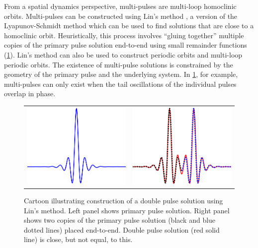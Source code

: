 \documentclass[12pt,reqno,oneside,hidelinks]{article}
\begin{document}
From a spatial dynamics perspective, multi-pulses are multi-loop homoclinic orbits. Multi-pulses can be constructed using Lin's method \cite{Lin2008}, a version of the Lyapunov-Schmidt method which can be used to find solutions that are close to a homoclinic orbit. Heuristically, this process involves ``gluing together'' multiple copies of the primary pulse solution end-to-end using small remainder functions (\cref{fig:linsmethod}). Lin's method can also be used to construct periodic orbits and multi-loop periodic orbits. The existence of multi-pulse solutions is constrained by the geometry of the primary pulse and the underlying system. In \cref{fig:linsmethod}, for example, multi-pulses can only exist when the tail oscillations of the individual pulses overlap in phase.
\begin{figure}
    \centering
    \begin{tabular}{cc}
        \includegraphics[width=5.65cm]{images/linchen1.png} &
        \includegraphics[width=5.65cm]{images/linchen2.png} 
    \end{tabular}
    \caption{Cartoon illustrating construction of a double pulse solution using Lin's method. Left panel shows primary pulse solution. Right panel shows two copies of the primary pulse solution (black and blue dotted lines) placed end-to-end. Double pulse solution (red solid line) is close, but not equal, to this.}
    \label{fig:linsmethod}
\end{figure}
\end{document}
